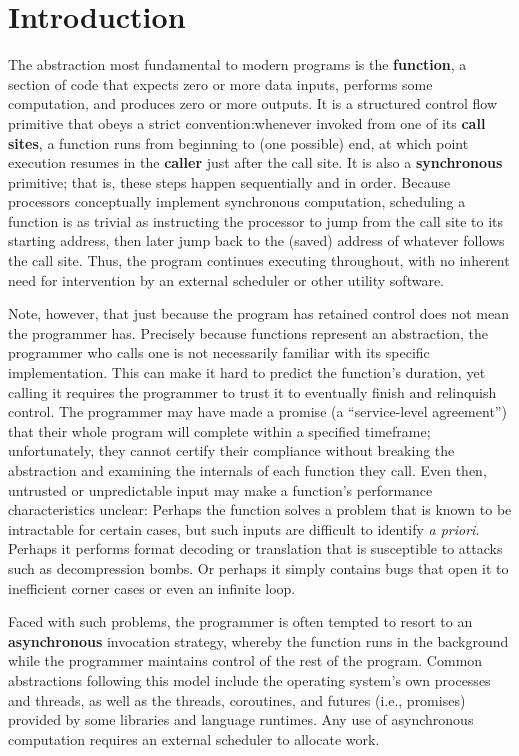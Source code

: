 \chapter{Introduction}

The abstraction most fundamental to modern programs is the \textbf{function}, a
section of code that expects zero or more data inputs, performs some computation, and
produces zero or more outputs.  It is a structured control flow primitive that obeys
a strict convention:\@ whenever invoked from one of its \textbf{call sites}, a
function runs from beginning to (one possible) end, at which point execution resumes
in the \textbf{caller} just after the call site.  It is also a \textbf{synchronous}
primitive; that is, these steps happen sequentially and in order.  Because
processors conceptually implement synchronous computation, scheduling a function is
as trivial as instructing the processor to jump from the call site to its starting
address, then later jump back to the (saved) address of whatever follows the call
site.  Thus,
the program continues executing throughout, with no inherent need for intervention by
an external scheduler or other utility software.

Note, however, that just because the program has retained control does not mean the
programmer has.  Precisely because functions represent an abstraction, the programmer
who calls one is not necessarily familiar with its specific implementation.  This can
make it hard to predict the function's duration, yet calling it requires the
programmer to trust it to eventually finish and relinquish control.  The programmer
may have made a promise (a ``service-level agreement'') that their whole program
will complete within a specified timeframe; unfortunately, they cannot certify their
compliance without breaking the abstraction and examining the internals of each
function they call.  Even then, untrusted or unpredictable input may make a
function's performance characteristics unclear:  Perhaps the function solves a
problem that is
known to be intractable for certain cases, but such inputs are difficult to identify
\textit{a priori}.  Perhaps it performs format decoding or translation that is
susceptible to attacks such as decompression bombs.  Or perhaps it simply contains
bugs that open it to inefficient corner cases or even an infinite loop.

Faced with such problems, the programmer is often tempted to resort to an
\textbf{asynchronous} invocation strategy, whereby the function runs in the
background while the programmer maintains control of the rest of the program.  Common
abstractions following this model include the operating system's own processes and
threads, as well as the threads, coroutines, and futures (i.e., promises) provided by
some libraries and language runtimes.  Any use of asynchronous computation requires
an external scheduler to allocate work.


